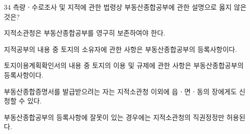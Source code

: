 \begin{question}{34}
측량ㆍ수로조사 및 지적에 관한 법령상 부동산종합공부에 관한 설명으로 옳지 않은 것은?
\begin{choices}
  \item 지적소관청은 부동산종합공부를 영구히 보존하여야 한다.
  \item 지적공부의 내용 중 토지의 소유자에 관한 사항은 부동산종합공부의 등록사항이다.
  \item 토지이용계획확인서의 내용 중 토지의 이용 및 규제에 관한 사항은 부동산종합공부의 등록사항이다.
  \item 부동산종합증명서를 발급받으려는 자는 지적소관청 이외에 읍ㆍ면ㆍ동의 장에게도 신청할 수 있다.
  \item 부동산종합공부의 등록사항에 잘못이 있는 경우에는 지적소관청의 직권정정만 허용된다.
\end{choices}
\end{question}
